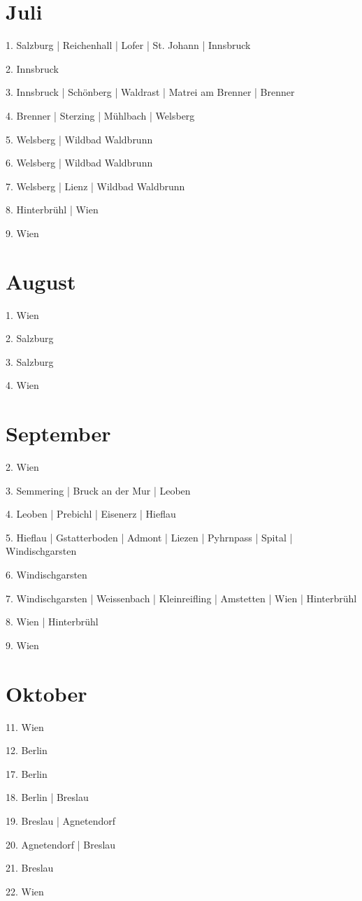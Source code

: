 \documentclass[twoside=false,titlepage=false,open=any, parskip=never, fontsize=10pt, headings=small, chapterprefix=false, appendixprefix=false, DIV=15]{scrbook}
\begin{document}
\begin{multicols}{3}
            \section*{Juli}
            1. Salzburg | Reichenhall | Lofer | St. Johann | Innsbruck\par
            2. Innsbruck\par
            3. Innsbruck | Schönberg | Waldrast | Matrei am Brenner | Brenner\par
            4. Brenner | Sterzing | Mühlbach | Welsberg\par
            5. Welsberg | Wildbad Waldbrunn\par
            6. Welsberg | Wildbad Waldbrunn\par
            7. Welsberg | Lienz | Wildbad Waldbrunn\par
            8. Hinterbrühl | Wien\par
            9. Wien\par
            \section*{August}
            1. Wien\par
            2. Salzburg\par
            3. Salzburg\par
            4. Wien\par
            \section*{September}
            2. Wien\par
            3. Semmering | Bruck an der Mur | Leoben\par
            4. Leoben | Prebichl | Eisenerz | Hieflau\par
            5. Hieflau | Gstatterboden | Admont | Liezen | Pyhrnpass | Spital | Windischgarsten\par
            6. Windischgarsten\par
            7. Windischgarsten | Weissenbach | Kleinreifling | Amstetten | Wien | Hinterbrühl\par
            8. Wien | Hinterbrühl\par
            9. Wien\par
            \section*{Oktober}
            11. Wien\par
            12. Berlin\par
            17. Berlin\par
            18. Berlin | Breslau\par
            19. Breslau | Agnetendorf\par
            20. Agnetendorf | Breslau\par
            21. Breslau\par
            22. Wien\par

\end{multicols}
\end{document}
